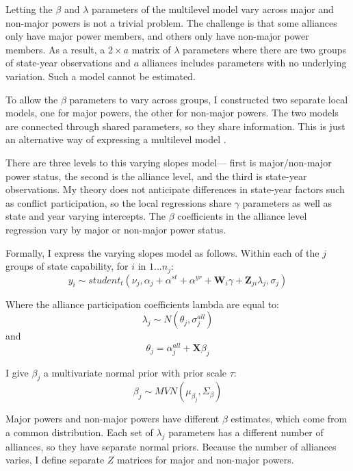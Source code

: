 \documentclass[12pt]{article}
\begin{document}
Letting the $\beta$ and $\lambda$ parameters of the multilevel model vary across major and non-major powers is not a trivial problem. 
The challenge is that some alliances only have major power members, and others only have non-major power members. 
As a result, a $2 \times a$ matrix of $\lambda$ parameters where there are two groups of state-year observations and $a$ alliances includes parameters with no underlying variation. 
Such a model cannot be estimated. 


To allow the $\beta$ parameters to vary across groups, I constructed two separate local models, one for major powers, the other for non-major powers. 
The two models are connected through shared parameters, so they share information.
This is just an alternative way of expressing a multilevel model \citet[pg. 263]{GelmanHill2007}. 


There are three levels to this varying slopes model--- first is major/non-major power status, the second is the alliance level, and the third is state-year observations. 
My theory does not anticipate differences in state-year factors such as conflict participation, so the local regressions share $\gamma$ parameters as well as state and year varying intercepts. 
The $\beta$ coefficients in the alliance level regression vary by major or non-major power status. 


Formally, I express the varying slopes model as follows. 
Within each of the $j$ groups of state capability, for $i$ in $1 ... n_j$: 
\begin{equation}
y_i \sim student_t(\nu_j, \alpha_j + \alpha^{st} + \alpha^{yr} +\textbf{W}_{i} \gamma  + \textbf{Z}_{ji} \lambda_{j}, \sigma_j) 
\end{equation} 

Where the alliance participation coefficients lambda are equal to:
\begin{equation}
\lambda_{j} \sim N(\theta_{j}, \sigma^{all}_{j})
\end{equation} 
and 
\begin{equation}
\theta_{j} = \alpha^{all}_{j} + \textbf{X} \beta_j
\end{equation}


I give $\beta_j$ a multivariate normal prior with prior scale $\tau$:
\begin{equation}
\beta_j \sim MVN(\mu_{\beta_j}, \Sigma_{\beta}) 
\end{equation}

 
Major powers and non-major powers have different $\beta$ estimates, which come from a common distribution. 
Each set of $\lambda_j$ parameters has a different number of alliances, so they have separate normal priors. 
Because the number of alliances varies, I define separate $Z$ matrices for major and non-major powers. 
\end{document}
